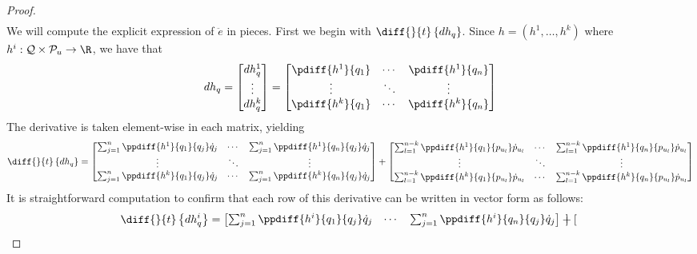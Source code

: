 \begin{proof}
\begin{align*}
    \end{align*}
    We will compute the explicit expression of \(\ddot{e}\) in pieces. 
    First we begin with \(\diff{}{t}\left\{dh_q\right\}\). 
    Since \(h = (h^1,\ldots,h^k)\) where 
    \(h^i : \mathcal{Q} \times \mathcal{P}_u \rightarrow \R\), we have that 
    \[
        dh_q = \begin{bmatrix}
            dh^1_q \\
            \vdots \\
            dh^k_q
        \end{bmatrix} = \begin{bmatrix}
        \pdiff{h^1}{q_1} & \cdots & \pdiff{h^1}{q_n} \\
        \vdots & \ddots & \vdots \\
        \pdiff{h^k}{q_1} & \cdots & \pdiff{h^k}{q_n}
        \end{bmatrix}
    \]
    The derivative is taken element-wise in each matrix, yielding
    \[
        \diff{}{t}\left\{dh_q\right\} = \begin{bmatrix}
            \sum_{j=1}^n \ppdiff{h^1}{q_1}{q_j}\dot{q}_j & \cdots & \sum_{j=1}^n
            \ppdiff{h^1}{q_n}{q_j}\dot{q}_j \\
            \vdots & \ddots & \vdots \\
            \sum_{j=1}^n \ppdiff{h^k}{q_1}{q_j}\dot{q}_j & \cdots & \sum_{j=1}^n
            \ppdiff{h^k}{q_n}{q_j}\dot{q}_j \\
        \end{bmatrix} + \begin{bmatrix}
            \sum_{l=1}^{n-k}\ppdiff{h^1}{q_1}{p_{u_l}}\dot{p}_{u_l} & \cdots &
            \sum_{l=1}^{n-k}\ppdiff{h^1}{q_n}{p_{u_l}}\dot{p}_{u_l} \\
            \vdots & \ddots & \vdots \\
            \sum_{l=1}^{n-k}\ppdiff{h^k}{q_1}{p_{u_l}}\dot{p}_{u_l} & \cdots & 
            \sum_{l=1}^{n-k}\ppdiff{h^k}{q_n}{p_{u_l}}\dot{p}_{u_l} \\
        \end{bmatrix}
    \]
    It is straightforward computation to confirm that each row of this
    derivative can be written in vector form as follows:
    \begin{align*}
        \diff{}{t}\left\{dh^i_q\right\} &= \begin{bmatrix}
        \sum_{j=1}^n \ppdiff{h^i}{q_1}{q_j}\dot{q}_j & \cdots & 
        \sum_{j=1}^n \ppdiff{h^i}{q_n}{q_j}\dot{q}_j 
        \end{bmatrix} + \begin{bmatrix}

\end{bmatrix}
\end{align*}
\end{proof}
